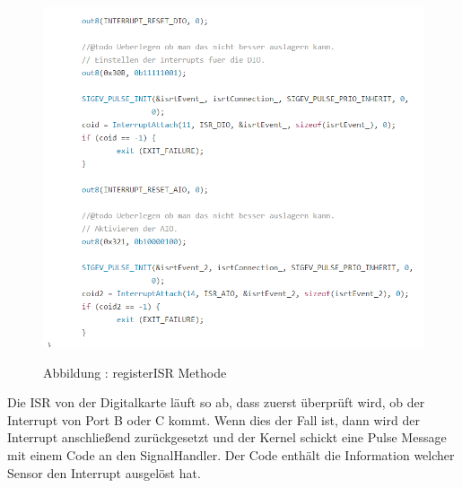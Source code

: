 \documentclass[a4paper, 11pt]{article}
\begin{document}
\begin{figure}[h]
\centering 
    \includegraphics[scale=0.7]{ISR/regisr.png}
    
    \small Abbildung \theimgcounter : registerISR Methode
    \label{regisr}
\end{figure}

Die ISR von der Digitalkarte läuft so ab, dass zuerst überprüft wird, ob der Interrupt von Port B oder C kommt. Wenn dies der Fall ist, dann wird der Interrupt anschließend zurückgesetzt und der Kernel schickt eine Pulse Message mit einem Code an den SignalHandler. Der Code enthält die Information welcher Sensor den Interrupt ausgelöst hat.

\newpage
\end{document}
